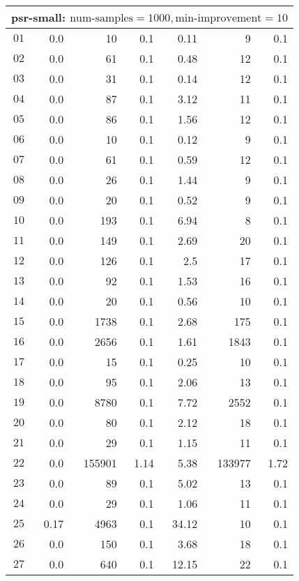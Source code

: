\begin{longtable}{|c||r|r|r||r|r|r|}
\multicolumn{7}{|l|}{psr-small: $\text{num-samples}=1000,\text{min-improvement}=10$}\\\hline
$01$ & 0.0 & 10 & 0.1 &0.11 & 9 & 0.1 \\\hline
$02$ & 0.0 & 61 & 0.1 &0.48 & 12 & 0.1 \\\hline
$03$ & 0.0 & 31 & 0.1 &0.14 & 12 & 0.1 \\\hline
$04$ & 0.0 & 87 & 0.1 &3.12 & 11 & 0.1 \\\hline
$05$ & 0.0 & 86 & 0.1 &1.56 & 12 & 0.1 \\\hline
$06$ & 0.0 & 10 & 0.1 &0.12 & 9 & 0.1 \\\hline
$07$ & 0.0 & 61 & 0.1 &0.59 & 12 & 0.1 \\\hline
$08$ & 0.0 & 26 & 0.1 &1.44 & 9 & 0.1 \\\hline
$09$ & 0.0 & 20 & 0.1 &0.52 & 9 & 0.1 \\\hline
$10$ & 0.0 & 193 & 0.1 &6.94 & 8 & 0.1 \\\hline
$11$ & 0.0 & 149 & 0.1 &2.69 & 20 & 0.1 \\\hline
$12$ & 0.0 & 126 & 0.1 &2.5 & 17 & 0.1 \\\hline
$13$ & 0.0 & 92 & 0.1 &1.53 & 16 & 0.1 \\\hline
$14$ & 0.0 & 20 & 0.1 &0.56 & 10 & 0.1 \\\hline
$15$ & 0.0 & 1738 & 0.1 &2.68 & 175 & 0.1 \\\hline
$16$ & 0.0 & 2656 & 0.1 &1.61 & 1843 & 0.1 \\\hline
$17$ & 0.0 & 15 & 0.1 &0.25 & 10 & 0.1 \\\hline
$18$ & 0.0 & 95 & 0.1 &2.06 & 13 & 0.1 \\\hline
$19$ & 0.0 & 8780 & 0.1 &7.72 & 2552 & 0.1 \\\hline
$20$ & 0.0 & 80 & 0.1 &2.12 & 18 & 0.1 \\\hline
$21$ & 0.0 & 29 & 0.1 &1.15 & 11 & 0.1 \\\hline
$22$ & 0.0 & 155901 & 1.14 &5.38 & 133977 & 1.72 \\\hline
$23$ & 0.0 & 89 & 0.1 &5.02 & 13 & 0.1 \\\hline
$24$ & 0.0 & 29 & 0.1 &1.06 & 11 & 0.1 \\\hline
$25$ & 0.17 & 4963 & 0.1 &34.12 & 10 & 0.1 \\\hline
$26$ & 0.0 & 150 & 0.1 &3.68 & 18 & 0.1 \\\hline
$27$ & 0.0 & 640 & 0.1 &12.15 & 22 & 0.1 \\\hline

\end{longtable}
